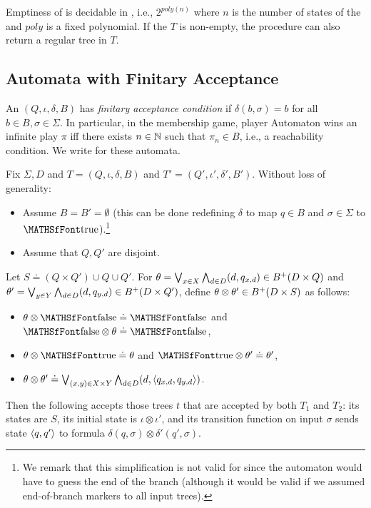  


\begin{fact} \label{fact:ABT-emptiness} 
Emptiness of \ABT is decidable in \exptime, i.e., 
$2^{poly(n)}$ where $n$ is the number of states of the \ABT and $poly$ is a fixed polynomial.
If the \ABT $T$ is non-empty, the procedure can also return a regular tree in $T$. 
\end{fact}



\subsection{Automata with Finitary Acceptance}

An \ABT $(Q,\iota,\delta,B)$ has \emph{finitary acceptance condition} if $\delta(b,\sigma) = b$ for all $b \in B, \sigma \in \Sigma$. In particular, in the membership game, player Automaton wins an infinite play $\pi$ iff there exists $n \in \mathbb{N}$ such that $\pi_n \in B$, i.e., a reachability condition. We write \AFT for these automata. 


\begin{fact} \label{fact:nft-intersection}
 Fix $\Sigma, D$ and \NFT $T = (Q,\iota,\delta,B)$ and $T' = (Q',\iota',\delta',B')$. Without loss of generality:
 \begin{itemize}
 \item Assume $B = B' = \emptyset$ (this can be done redefining $\delta$ to map $q \in B$ and $\sigma \in \Sigma$ to $\true$).\footnote{We remark that this simplification is not valid for \DFTf 
 since the automaton would have to guess the end of the branch (although it would be valid if we assumed end-of-branch markers to all input trees).}
 \item  Assume that $Q,Q'$ are disjoint.
 \end{itemize}
 Let $S \doteq (Q \times Q') \cup Q \cup Q'$.
 For $\theta = \bigvee_{x \in X} \bigwedge_{d \in D} (d,q_{x,d}) \in B^+(D \times Q)$ and 
 $\theta'  = \bigvee_{y \in Y} \bigwedge_{d \in D} (d,q_{y,d}) \in B^+(D \times Q')$, define $\theta \otimes \theta' \in B^+(D \times S)$ as follows:
 \begin{itemize}
 \item  $\theta \otimes \false \doteq \false$ and $\false \otimes \theta \doteq \false$, 
 \item  $\theta \otimes \true \doteq \theta$ and $\true \otimes \theta' \doteq \theta'$, 
 \item  $\theta \otimes \theta' \doteq
  \bigvee_{(x,y) \in X \times Y} \bigwedge_{d \in D} (d,\langle {q_{x,d},q_{y,d}} \rangle)$.
 \end{itemize}

 
 
 Then the following \NFT accepts those trees $t$ that are accepted by both $T_1$ and $T_2$: 
 its states are $S$, its initial state is $\iota \otimes \iota'$, and its transition function on input $\sigma$ sends state $\langle {q,q'} \rangle$ to formula 
 $\delta(q,\sigma) \otimes \delta'(q',\sigma)$.
 \end{fact}
 
